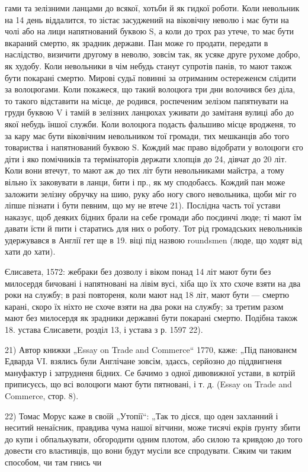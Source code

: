 гами та зелізними ланцами до всякої, хотьби й як гидкої роботи. Коли невольник на 14 день
віддалится, то зістає засуджений на віковічну неволю і має бути на чолі або на
лици напятнований буквою S, а коли до трох раз утече, то має бути вкараний смертю, як зрадник
держави. Пан може го продати, передати в наслідство, визичити другому в неволю, зовсім так, як усяке
друге рухоме добро, як худобу. Коли невольники в чім небудь станут супротів панів, то мают також
бути покарані смертю. Мирові судьї повинні за отриманим остереженєм слідити за волоцюгами. Коли
покажеся, що такий волоцюга три дни волочився без діла, то такого відставити на місце, де родився,
роспеченим зелізом папятнувати на груди буквою V і тамій в зелізних ланцюхах
уживати до замітаня вулиці або до якої небудь їншої служби. Коли волоцюга подасть фальшиво місце
вродженя, то за кару має бути віковічним невольником тої громади,
тих мешканців або того товариства і напятнований буквою S. Кождий має право відобрати у волоцюги єго
діти і яко помічників та термінаторів держати хлопців до 24, дівчат до 20 літ. Коли вони втечут, то
мают аж до тих літ бути невольниками майстра, а тому вільно їх заковувати в ланци, бити і пр., як му
сподобаєсь. Кождий пан може заложити зелізну обручку на шию, руку або ногу свого невольника, щоби
міг го ліпше пізнати і бути певним, що му не втече 21). Послідна часть тої устави наказує, щоб
деяких бідних брали на себе громади або поєдинчі люде; ті мают їм давати їсти
й пити і старатись для них о роботу. Тот рід громадських невольників удержувався в Англії гет ще в
19. віці під назвою roundsmen (люде, що ходят від хати до хати).

Єлисавета, 1572: жебраки без дозволу і віком понад 14 літ мают бути без милосердя бичовані і
напятновані на лівім вусі, хіба що їх хто схоче взяти на два роки на службу; в разі повтореня, коли
мают над 18 літ, мают бути — смертю карані, скоро їх ніхто не схоче взяти на два роки на службу; за
третим разом мают без милосердя як зрадники державні бути покарані смертю. Подібна також 18. устава
Єлисавети, розділ 13, і устава з р. 1597 22).

21)    Автор книжки „Essay on Trade and Commerce“ 1770, каже: „Під панованєм Едварда VI. взялись
були Англічане зовсім, здаєсь, серйозно до піддвигненя мануфактур і затрудненя бідних. Се бачимо з
одної дивовижної устави, в котрій приписуєсь, що всі волоцюги мают бути пятновані, і т. д. (Essay on
Trade and Commerce, стор. 8).

22)    Томас Морус каже в своїй „Утопії“: „Так то дієся, що оден захланний і неситий ненаїсник,
правдива чума нашої вітчини, може тисячі екрів ґрунту збити до купи і обпалькувати, обгородити одним
плотом, або силою та кривдою до того довести єго властивців, що вони будут мусіли все спродувати.
Сяким чи таким способом, чи там гнись чи
